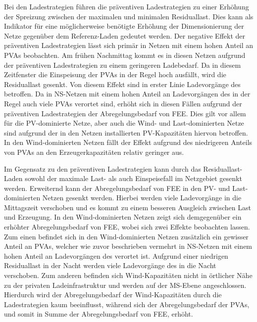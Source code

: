 Bei den Ladestrategien führen die präventiven Ladestrategien zu einer Erhöhung der Spreizung zwischen der maximalen und minimalen Residuallast.
Dies kann als Indikator für eine möglicherweise benötigte Erhöhung der Dimensionierung der Netze gegenüber dem Referenz-Laden gedeutet werden.
Der negative Effekt der präventiven Ladestrategien lässt sich primär in Netzen mit einem hohen Anteil an \glspl{PVA} beobachten.
Am frühen Nachmittag kommt es in diesen Netzen aufgrund der präventiven Ladestrategien zu einem geringeren Ladebedarf.
Da in diesem Zeitfenster die Einspeisung der \glspl{PVA} in der Regel hoch ausfällt, wird die Residuallast gesenkt.
Von diesem Effekt sind in erster Linie Ladevorgänge des \UC \zH betroffen.
Da in \gls{NS}-Netzen mit einem hohen Anteil an Ladevorgängen des \UC \zH in der Regel auch viele \glspl{PVA} verortet sind, erhöht sich in diesen Fällen aufgrund der präventiven Ladestrategien der Abregelungsbedarf von \gls{FEE}.
Dies gilt vor allem für die \gls{PV}-dominierte Netze, aber auch die Wind- und Last-dominierten Netze sind aufgrund der in den Netzen installierten \gls{PV}-Kapazitäten hiervon betroffen.
In den Wind-dominierten Netzen fällt der Effekt aufgrund des niedrigeren Anteils von \glspl{PVA} an den Erzeugerkapazitäten relativ geringer aus.\medskip

Im Gegensatz zu den präventiven Ladestrategien kann durch das Residuallast-Laden sowohl der maximale Last- als auch Einspeisefall im Netzgebiet gesenkt werden.
Erweiternd kann der Abregelungsbedarf von \gls{FEE} in den \gls{PV}- und Last-dominierten Netzen gesenkt werden.
Hierbei werden viele Ladevorgänge in die Mittagszeit verschoben und es kommt zu einem besseren Ausgleich zwischen Last und Erzeugung.
In den Wind-dominierten Netzen zeigt sich demgegenüber ein erhöhter Abregelungsbedarf von \gls{FEE}, wobei sich zwei Effekte beobachten lassen.
Zum einen befindet sich in den Wind-dominierten Netzen zusätzlich ein gewisser Anteil an \glspl{PVA}, welcher wie zuvor beschrieben vermehrt in \gls{NS}-Netzen mit einem hohen Anteil an Ladevorgängen des \UC \zH verortet ist.
Aufgrund einer niedrigen Residuallast in der Nacht werden viele Ladevorgänge des \UC \zH in die Nacht verschoben.
Zum anderen befinden sich Wind-Kapazitäten nicht in örtlicher Nähe zu der privaten Ladeinfrastruktur und werden auf der \gls{MS}-Ebene angeschlossen.
Hierdurch wird der Abregelungsbedarf der Wind-Kapazitäten durch die Ladestrategien kaum beeinflusst, während sich der Abregelungsbedarf der \glspl{PVA}, und somit in Summe der Abregelungsbedarf von \gls{FEE}, erhöht.\medskip

